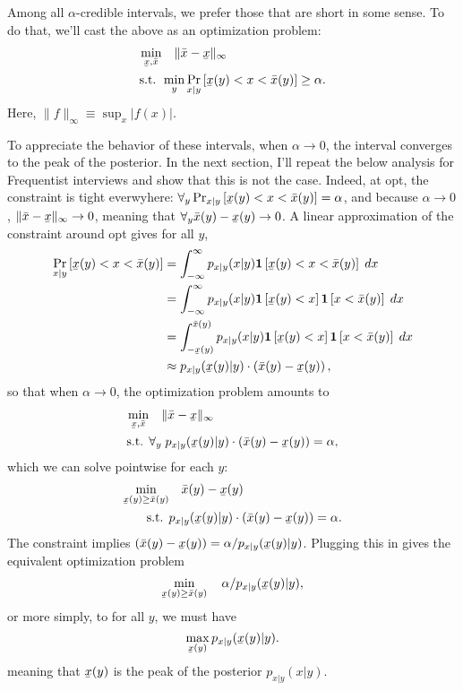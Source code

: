 \documentclass{article}
\newcommand{\xl}{\underaccent{\bar}{x}}
\newcommand{\xh}{\bar{x}}
\newcommand{\1}{\mathbf{1}}
\begin{document}
Among all $\alpha$-credible intervals, we prefer those that are short in some
sense. To do that, we'll cast the above as an optimization problem:
\begin{align}\label{eq:bayes-interval}
\min_{\xl, \xh} &\quad  \| \xh - \xl \|_\infty \\
\text{s.t. } & \min_y \Pr_{x|y}\left[\xl(y) < x < \xh(y)\right] \geq \alpha.
\end{align}
Here, $\|f\|_\infty \equiv \sup_x |f(x)|$.

To appreciate the behavior of these intervals, when $\alpha\to 0$, the interval
converges to the peak of the posterior. In the next section, I'll repeat the
below analysis for Frequentist interviews and show that this is not the case.
Indeed, at opt, the constraint is tight everwyhere: $\forall_y
\Pr_{x|y}\left[\xl(y) < x < \xh(y)\right] = \alpha$, and because $\alpha\to 0$,
$\| \xh - \xl \|_\infty \to 0$, meaning that $\forall_y \xh(y) - \xl(y) \to 0$.
A linear approximation of the constraint around opt gives for all $y$,
\begin{align}
        \Pr_{x|y}\left[\xl(y) < x < \xh(y)\right] &= \int_{-\infty}^\infty p_{x|y}(x|y) \1\left[ \xl(y) < x < \xh(y)\right] \;dx\\
        &= \int_{-\infty}^\infty p_{x|y}(x|y) \1\left[ \xl(y) < x\right] \1\left[x < \xh(y)\right] \;dx\\
        &= \int_{-\xl(y)}^{\xh(y)} p_{x|y}(x|y) \1\left[ \xl(y) < x\right] \1\left[x < \xh(y)\right] \;dx\\
        &\approx p_{x|y}(\xl(y) | y) \cdot \left(\xh(y)-\xl(y)\right),
\end{align}
so that when $\alpha\to 0$, the optimization problem amounts to
\begin{align}
\min_{\xl, \xh} &\quad  \| \xh - \xl \|_\infty \\
        \text{s.t. } & \forall_y\; p_{x|y}(\xl(y) | y) \cdot \left(\xh(y)-\xl(y)\right) =\alpha,
\end{align}
which we can solve pointwise for each $y$:
\begin{align}
        \min_{\xl(y)\geq \xh(y)} &\quad  \xh(y)-\xl(y) \\
        \text{s.t. } & p_{x|y}(\xl(y) | y) \cdot \left(\xh(y)-\xl(y)\right) =\alpha.
\end{align}
The constraint implies $ \left(\xh(y)-\xl(y)\right) = \alpha / p_{x|y}(\xl(y) | y) $. Plugging this in gives the equivalent optimization problem
\[
        \min_{\xl(y)\geq \xh(y)} \quad  \alpha / p_{x|y}(\xl(y) | y),
\]
or more simply, to for all $y$, we must have
\[
        \max_{\xl(y)}  p_{x|y}(\xl(y) | y).
\]
meaning that $\xl(y)$ is the peak of the posterior $p_{x|y}(x|y)$.
\end{document}
